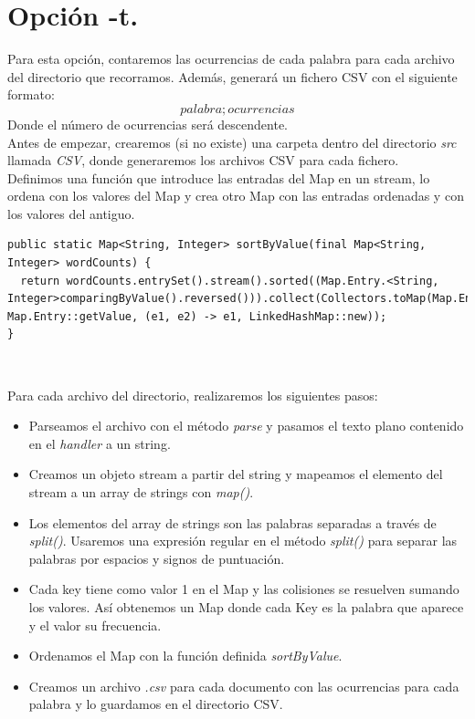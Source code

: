 \documentclass[12pt]{article}
\begin{document}
\clearpage

\section{Opción \textbf{-t}.}

Para esta opción, contaremos las ocurrencias de cada palabra para cada archivo del directorio que recorramos. Además, generará un fichero CSV con el siguiente formato: $$palabra ; ocurrencias$$
Donde el número de ocurrencias será descendente.\\

Antes de empezar, crearemos (si no existe) una carpeta dentro del directorio \textit{src} llamada \textit{CSV}, donde generaremos los archivos CSV para cada fichero.\\

Definimos una función que introduce las entradas del Map en un stream, lo ordena con los valores del Map y crea otro Map con las entradas ordenadas y con los valores del antiguo.\\
  
\begin{lstlisting}
public static Map<String, Integer> sortByValue(final Map<String, Integer> wordCounts) {
  return wordCounts.entrySet().stream().sorted((Map.Entry.<String, Integer>comparingByValue().reversed())).collect(Collectors.toMap(Map.Entry::getKey, Map.Entry::getValue, (e1, e2) -> e1, LinkedHashMap::new));
}
\end{lstlisting}\

Para cada archivo del directorio, realizaremos los siguientes pasos:

\begin{itemize}
\item Parseamos el archivo con el método \textit{parse} y pasamos el texto plano contenido en el \textit{handler} a un string.
\item Creamos un objeto stream a partir del string y mapeamos el elemento del stream a un array de strings con \textit{map()}. 
\item Los elementos del array de strings son las palabras separadas a través de \textit{split()}. Usaremos una expresión regular en el método \textit{split()} para separar las palabras por espacios y signos de puntuación.
\item Cada key tiene como valor 1 en el Map y las colisiones se resuelven sumando los valores. Así obtenemos un Map donde cada Key es la palabra que aparece y el valor su frecuencia.
\item Ordenamos el Map con la función definida \textit{sortByValue}.
\item Creamos un archivo \textit{.csv} para cada documento con las ocurrencias para cada palabra y lo guardamos en el directorio CSV.
\end{itemize}
\end{document}
